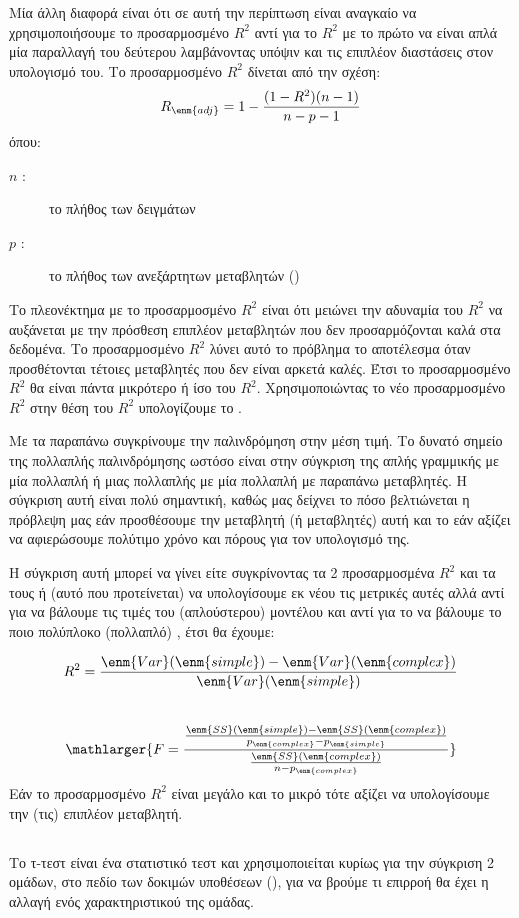 Μία άλλη
διαφορά είναι ότι σε αυτή την περίπτωση είναι αναγκαίο να χρησιμοποιήσουμε το
προσαρμοσμένο $R^2$ αντί για το $R^2$ με το πρώτο να είναι απλά μία παραλλαγή του δεύτερου
λαμβάνοντας υπόψιν και τις επιπλέον διαστάσεις στον υπολογισμό του. Το προσαρμοσμένο
$R^2$ δίνεται από την σχέση:
$$R_{\enm{adj}}=1-\frac{(1-R^2)(n-1)}{n-p-1}$$
όπου:
\begin{description}
    \item[$n$ :] το πλήθος των δειγμάτων
    \item[$p$ :] το πλήθος των ανεξάρτητων μεταβλητών ()
\end{description}
Το πλεονέκτημα με το προσαρμοσμένο $R^2$
είναι ότι μειώνει την αδυναμία του $R^2$
να
αυξάνεται με την πρόσθεση επιπλέον μεταβλητών που δεν προσαρμόζονται καλά στα
δεδομένα. Το προσαρμοσμένο $R^2$
λύνει αυτό το πρόβλημα  το αποτέλεσμα
όταν προσθέτονται τέτοιες μεταβλητές που δεν είναι αρκετά καλές. Έτσι το προσαρμοσμένο $R^2$
θα είναι πάντα μικρότερο ή ίσο του $R^2$. Χρησιμοποιώντας το νέο προσαρμοσμένο $R^2$ στην
θέση του $R^2$ υπολογίζουμε το .

Με τα παραπάνω συγκρίνουμε την παλινδρόμηση στην μέση τιμή. Το δυνατό σημείο της
πολλαπλής παλινδρόμησης ωστόσο είναι στην σύγκριση της απλής γραμμικής με μία
πολλαπλή ή μιας πολλαπλής με μία πολλαπλή με παραπάνω μεταβλητές. Η σύγκριση αυτή
είναι πολύ σημαντική, καθώς μας δείχνει το πόσο βελτιώνεται η πρόβλεψη μας εάν
προσθέσουμε την μεταβλητή (ή μεταβλητές) αυτή και το εάν αξίζει να αφιερώσουμε
πολύτιμο χρόνο και πόρους για τον υπολογισμό της.

Η σύγκριση αυτή μπορεί να γίνει είτε
συγκρίνοντας τα 2 προσαρμοσμένα $R^2$
και τα  τους ή (αυτό που προτείνεται) να
υπολογίσουμε εκ νέου τις μετρικές αυτές αλλά αντί για  να βάλουμε τις τιμές του 
(απλούστερου) μοντέλου και αντί για το  να βάλουμε το ποιο πολύπλοκο (πολλαπλό) , έτσι
θα έχουμε:

$$R^2=\frac{\enm{Var}(\enm{simple})-\enm{Var}(\enm{complex})}{\enm{Var}(\enm{simple})}$$
\\
$$\mathlarger{F =\frac{\frac{\enm{SS}(\enm{simple}) - \enm{SS}(\enm{complex})}{p_{\enm{complex}} - p_{\enm{simple}}}} {\frac{\enm{SS}(\enm{complex})}{n - p_{\enm{complex}}}}}$$
Εάν το προσαρμοσμένο $R^2$
είναι μεγάλο και το  μικρό τότε αξίζει να υπολογίσουμε την
(τις) επιπλέον μεταβλητή.
\subsection{}
Το τ-τεστ είναι ένα στατιστικό τεστ και χρησιμοποιείται κυρίως για την σύγκριση 2 ομάδων, στο
πεδίο των δοκιμών υποθέσεων (), για να βρούμε τι επιρροή θα έχει η
αλλαγή ενός χαρακτηριστικού της ομάδας.

